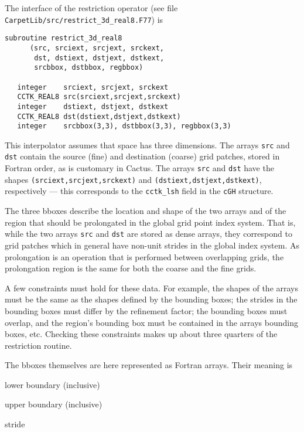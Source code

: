 \documentclass{article}
\begin{document}
   The interface of the restriction operator (see file
   \texttt{CarpetLib/src/restrict\_3d\_real8.F77}) is
\begin{verbatim}
subroutine restrict_3d_real8
      (src, srciext, srcjext, srckext,
       dst, dstiext, dstjext, dstkext,
       srcbbox, dstbbox, regbbox)

   integer    srciext, srcjext, srckext
   CCTK_REAL8 src(srciext,srcjext,srckext)
   integer    dstiext, dstjext, dstkext
   CCTK_REAL8 dst(dstiext,dstjext,dstkext)
   integer    srcbbox(3,3), dstbbox(3,3), regbbox(3,3)
\end{verbatim}
   This interpolator assumes that space has three dimensions.  The
   arrays \texttt{src} and \texttt{dst} contain the source (fine) and
   destination (coarse) grid patches, stored in Fortran order, as is
   customary in Cactus.  The arrays \texttt{src} and \texttt{dst} have
   the shapes \texttt{(srciext,srcjext,srckext)} and
   \texttt{(dstiext,dstjext,dstkext)}, respectively --- this
   corresponds to the \texttt{cctk\_lsh} field in the \texttt{cGH}
   structure.

   The three bboxes describe the location and shape of the two arrays
   and of the region that should be prolongated in the global grid
   point index system.  That is, while the two arrays \texttt{src} and
   \texttt{dst} are stored as dense arrays, they correspond to grid
   patches which in general have non-unit strides in the global index
   system.  As prolongation is an operation that is performed between
   overlapping grids, the prolongation region is the same for both the
   coarse and the fine grids.

   A few constraints must hold for these data.  For example, the
   shapes of the arrays must be the same as the shapes defined by the
   bounding boxes; the strides in the bounding boxes must differ by
   the refinement factor; the bounding boxes must overlap, and the
   region's bounding box must be contained in the arrays bounding
   boxes, etc.  Checking these constraints makes up about three
   quarters of the restriction routine.

   The bboxes themselves are here represented as Fortran arrays.
   Their meaning is
\begin{description}
\itemsep 0pt
\item[\texttt{bbox(:,1)}]
   lower boundary (inclusive)
\item[\texttt{bbox(:,2)}]
   upper boundary (inclusive)
\item[\texttt{bbox(:,3)}]
   stride
\end{description}
\end{document}

